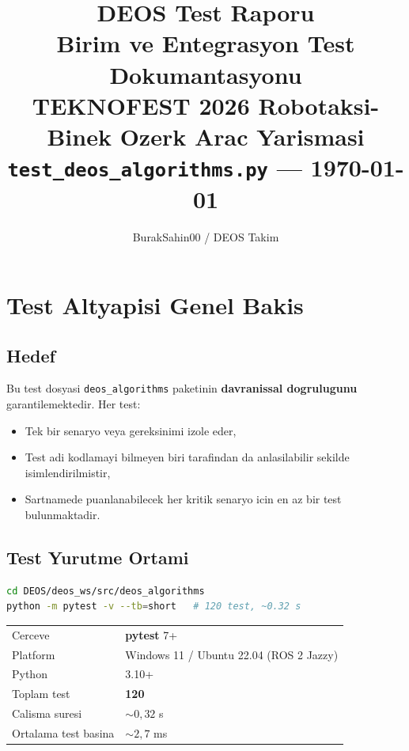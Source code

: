 \documentclass[a4paper,12pt]{article}
\title{
  \vspace{-1cm}
  \textbf{\LARGE DEOS Test Raporu}\\[0.4em]
  \large Birim ve Entegrasyon Test Dokumantasyonu\\[0.2em]
  \normalsize TEKNOFEST 2026 Robotaksi-Binek Ozerk Arac Yarismasi\\[0.2em]
  \normalsize \texttt{test\_deos\_algorithms.py} --- \today
}
\author{BurakSahin00 / DEOS Takim}
\date{}
\begin{document}
\maketitle
\tableofcontents
\newpage

\section{Test Altyapisi Genel Bakis}

\subsection{Hedef}

Bu test dosyasi \texttt{deos\_algorithms} paketinin \textbf{davranissal
dogrulugunu} garantilemektedir. Her test:

\begin{itemize}
  \item Tek bir senaryo veya gereksinimi izole eder,
  \item Test adi kodlamayi bilmeyen biri tarafindan da anlasilabilir
        sekilde isimlendirilmistir,
  \item Sartnamede puanlanabilecek her kritik senaryo icin en az bir test
        bulunmaktadir.
\end{itemize}

\subsection{Test Yurutme Ortami}

\begin{lstlisting}[language=bash, caption=Test calistirma]
cd DEOS/deos_ws/src/deos_algorithms
python -m pytest -v --tb=short   # 120 test, ~0.32 s
\end{lstlisting}

\begin{center}
\begin{tabular}{ll}
  \toprule
  Cerceve      & \textbf{pytest} 7+\\
  Platform     & Windows 11 / Ubuntu 22.04 (ROS 2 Jazzy)\\
  Python       & 3.10+\\
  Toplam test  & \textbf{120}\\
  Calisma suresi & $\sim 0{,}32$ s\\
  Ortalama test basina & $\sim 2{,}7$ ms\\
  \bottomrule
\end{tabular}
\end{center}
\end{document}
